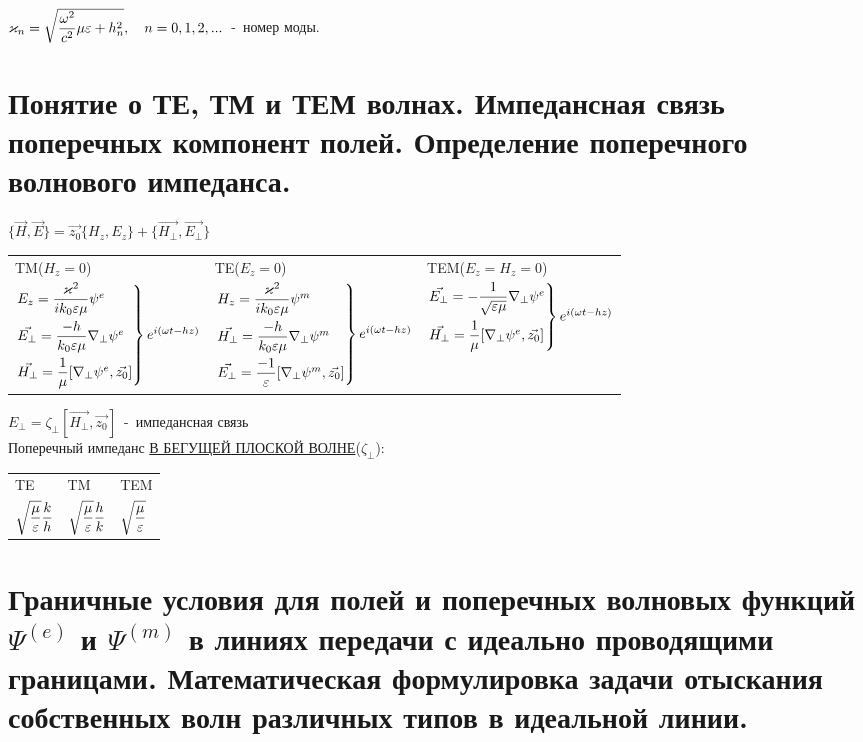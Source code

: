 \begin{multicols*}{2}
		$\varkappa_n=\sqrt{\dfrac{\omega^2}{c^2}\mu\varepsilon+h_n^2}, \quad n=0,1,2,...$~-~номер моды.
		
		\section{Понятие о ТЕ, ТМ и ТЕМ волнах. Импедансная связь поперечных компонент полей. Определение поперечного волнового импеданса. }
		
		$\{\vec{H},\vec{E}\}=\vec{z_0}\{{H_z},{E_z}\}+\{\vec{H_\perp},\vec{E_\perp}\}$ \\
		\begin{tabular}{l l l}
			TM($H_z=0$) & TE($E_z=0$) & TEM($E_z=H_z=0$) \\
			$\begin{rcases}
				E_z=\dfrac{\varkappa^2}{ik_0\varepsilon\mu}\psi^e \\
				\vec{E_\perp} = \dfrac{-h}{k_0\varepsilon\mu}\nabla_\perp\psi^e \\
				\vec{H_\perp}=\dfrac1{\mu}[\nabla_\perp\psi^e,\vec{z_0}]
			\end{rcases} e^{i(\omega t-hz)}$ & 
			$\begin{rcases}
				H_z=\dfrac{\varkappa^2}{ik_0\varepsilon\mu}\psi^m \\
				\vec{H_\perp} = \dfrac{-h}{k_0\varepsilon\mu}\nabla_\perp\psi^m \\
				\vec{E_\perp}=\dfrac{-1}{\varepsilon}[\nabla_\perp\psi^m,\vec{z_0}]
			\end{rcases} e^{i(\omega t-hz)}$ & 
			$\begin{rcases}
				\vec{E_\perp} =-\dfrac1{\sqrt{\varepsilon\mu}}\nabla_\perp\psi^e \\
				\vec{H_\perp}=\dfrac1{\mu}[\nabla_\perp\psi^e,\vec{z_0}]
			\end{rcases} e^{i(\omega t-hz)}$ \\
		\end{tabular}
		$E_\perp=\zeta_\perp[\vec{H_\perp},\vec{z_0}]$~-~импедансная связь \\
		Поперечный импеданс \underline{В БЕГУЩЕЙ ПЛОСКОЙ ВОЛНЕ}($\zeta_\perp$): \\
		\begin{tabular}{l l l}
			TE & TM & TEM \\
			$\sqrt{\dfrac{\mu}{\varepsilon}}\dfrac kh$ & $\sqrt{\dfrac{\mu}{\varepsilon}}\dfrac hk$ & $\sqrt{\dfrac{\mu}{\varepsilon}}$ \\
		\end{tabular}
		
		\section{Граничные условия для полей и поперечных волновых функций $\Psi^{(e)}$ и $\Psi^{(m)}$ в линиях передачи с идеально проводящими границами. Математическая формулировка задачи отыскания собственных волн различных типов в идеальной линии.}
		

\end{multicols*}
